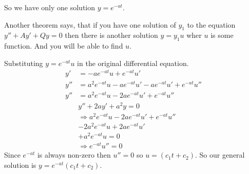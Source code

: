 So we have only one solution $y = e^{-at}$.

Another theorem says, that if you have one solution of $y_1$ to the equation $y'' + Ay' + Qy = 0$
then there is another solution $y = y_1 u$ wher $u$ is some function.
And you will be able to find $u$.

Substituting $y = e^{-at} u$ in the original differential equation.
\begin{align*}
    y' & = -ae^{-at} u + e^{-at} u' \\
    y'' & = a^2 e^{-at} u - a e^{-at} u' -a e^{-at} u' + e^{-at} u'' \\
    y'' & = a^2 e^{-at} u - 2 a e^{-at} u' + e^{-at} u'' \\
    & y'' + 2ay' + a^2y = 0 \\
    & \Rightarrow a^2 e^{-at} u - 2 a e^{-at} u' + e^{-at} u'' \\
    & - 2 a^2 e^{-at} u + 2a e^{-at} u' \\
    & + a^2 e^{-at} u = 0 \\
    & \Rightarrow e^{-at} u'' = 0
\end{align*}
Since $e^{-at}$ is always non-zero then $u'' = 0$ so $u = (c_1t + c_2)$.
So our general solution is $y = e^{-at}(c_1t + c_2)$.
